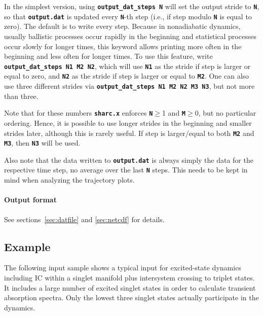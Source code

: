 \documentclass[a4paper,10pt,DIV=15,openany]{scrbook}
\newcommand{\ttt}[1]{\textbf{\texttt{#1}}}
\begin{document}
In the simplest version, using \ttt{output\_dat\_steps N} will set the output stride to \ttt{N}, so that \ttt{output.dat} is updated every \ttt{N}-th step (i.e., if step modulo \ttt{N} is equal to zero).
The default is to write every step.
Because in nonadiabatic dynamics, usually ballistic processes occur rapidly in the beginning and statistical processes occur slowly for longer times, this keyword allows printing more often in the beginning and less often for longer times.
To use this feature, write \ttt{output\_dat\_steps N1 M2 N2}, which will use \ttt{N1} as the stride if step is larger or equal to zero, and \ttt{N2} as the stride if step is larger or equal to \ttt{M2}.
One can also use three different strides via \ttt{output\_dat\_steps N1 M2 N2 M3 N3}, but not more than three.

Note that for these numbers \ttt{sharc.x} enforces \ttt{N}$\geq$1 and \ttt{M}$\geq$0, but no particular ordering.
Hence, it is possible to use longer strides in the beginning and smaller strides later, although this is rarely useful.
If step is larger/equal to both \ttt{M2} and \ttt{M3}, then \ttt{N3} will be used.

Also note that the data written to \ttt{output.dat} is always simply the data for the respective time step, no average over the last \ttt{N} steps.
This needs to be kept in mind when analyzing the trajectory plots.

\paragraph{Output format}

See sections~\ref{sec:datfile} and \ref{sec:netcdf} for details.





\subsection{Example}

The following input sample shows a typical input for excited-state dynamics including IC within a singlet manifold plus intersystem crossing to triplet states. It includes a large number of excited singlet states in order to calculate transient absorption spectra. Only the lowest three singlet states actually participate in the dynamics. 
\end{document}
